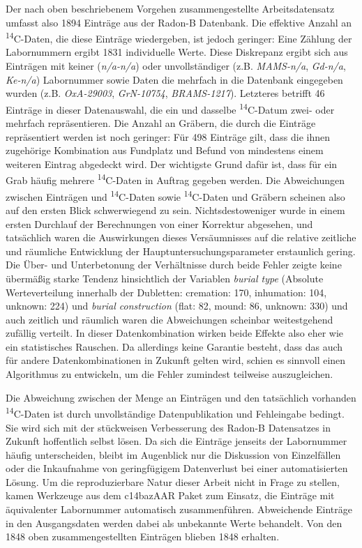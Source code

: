 \documentclass[openany,twoside,twocolumn]{book}
\begin{document}
Der nach oben beschriebenem Vorgehen zusammengestellte Arbeitsdatensatz umfasst also 1894 Einträge aus der Radon-B Datenbank. Die effektive Anzahl an \textsuperscript{14}C-Daten, die diese Einträge wiedergeben, ist jedoch geringer: Eine Zählung der Labornummern ergibt 1831 individuelle Werte. Diese Diskrepanz ergibt sich aus Einträgen mit keiner (\emph{n/a-n/a}) oder unvollständiger (z.B. \emph{MAMS-n/a}, \emph{Gd-n/a}, \emph{Ke-n/a}) Labornummer sowie Daten die mehrfach in die Datenbank eingegeben wurden (z.B. \emph{OxA-29003}, \emph{GrN-10754}, \emph{BRAMS-1217}). Letzteres betrifft 46 Einträge in dieser Datenauswahl, die ein und dasselbe \textsuperscript{14}C-Datum zwei- oder mehrfach repräsentieren. Die Anzahl an Gräbern, die durch die Einträge repräsentiert werden ist noch geringer: Für 498 Einträge gilt, dass die ihnen zugehörige Kombination aus Fundplatz und Befund von mindestens einem weiteren Eintrag abgedeckt wird. Der wichtigste Grund dafür ist, dass für ein Grab häufig mehrere \textsuperscript{14}C-Daten in Auftrag gegeben werden. Die Abweichungen zwischen Einträgen und \textsuperscript{14}C-Daten sowie \textsuperscript{14}C-Daten und Gräbern scheinen also auf den ersten Blick schwerwiegend zu sein. Nichtsdestoweniger wurde in einem ersten Durchlauf der Berechnungen von einer Korrektur abgesehen, und tatsächlich waren die Auswirkungen dieses Versäumnisses auf die relative zeitliche und räumliche Entwicklung der Hauptuntersuchungsparameter erstaunlich gering. Die Über- und Unterbetonung der Verhältnisse durch beide Fehler zeigte keine übermäßig starke Tendenz hinsichtlich der Variablen \emph{burial type} (Absolute Werteverteilung innerhalb der Dubletten: cremation: 170, inhumation: 104, unknown: 224) und \emph{burial construction} (flat: 82, mound: 86, unknown: 330) und auch zeitlich und räumlich waren die Abweichungen scheinbar weitestgehend zufällig verteilt. In dieser Datenkombination wirken beide Effekte also eher wie ein statistisches Rauschen. Da allerdings keine Garantie besteht, dass das auch für andere Datenkombinationen in Zukunft gelten wird, schien es sinnvoll einen Algorithmus zu entwickeln, um die Fehler zumindest teilweise auszugleichen.

Die Abweichung zwischen der Menge an Einträgen und den tatsächlich vorhanden \textsuperscript{14}C-Daten ist durch unvollständige Datenpublikation und Fehleingabe bedingt. Sie wird sich mit der stückweisen Verbesserung des Radon-B Datensatzes in Zukunft hoffentlich selbst lösen. Da sich die Einträge jenseits der Labornummer häufig unterscheiden, bleibt im Augenblick nur die Diskussion von Einzelfällen oder die Inkaufnahme von geringfügigem Datenverlust bei einer automatisierten Lösung. Um die reproduzierbare Natur dieser Arbeit nicht in Frage zu stellen, kamen Werkzeuge aus dem c14bazAAR Paket zum Einsatz, die Einträge mit äquivalenter Labornummer automatisch zusammenführen. Abweichende Einträge in den Ausgangsdaten werden dabei als unbekannte Werte behandelt. Von den 1848 oben zusammengestellten Einträgen blieben 1848 erhalten.
\end{document}
